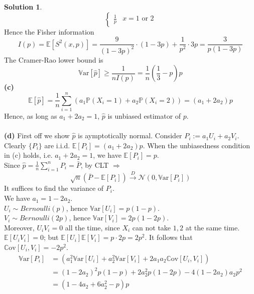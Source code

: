 \documentclass[a4paper, 10pt]{article}
\theoremstyle{definition}
\theoremstyle{hSol}
\newtheorem*{solution}{Solution}
\begin{document}
\begin{solution}
\begin{equation}
\begin{cases}
  \frac{1}{p} & x=1 \text{ or }2
  \end{cases}
\end{equation}
Hence the Fisher information
$$
I(p) = \mathbb{E}\left[S^2(x, p)\right] = \frac{9}{(1-3p)^2} \cdot (1-3p) + \frac{1}{p^2}\cdot 3p = \frac{3}{p(1-3p)}
$$
The Cramer-Rao lower bound is
$$
\mathrm{\mathbb{V}ar}\left[\hat{p}\right] \geq \frac{1}{nI(p)} = \frac{1}{n}\left(\frac{1}{3}-p\right)p
$$
\textbf{(c)}
\begin{equation}
  \mathbb{E}\left[\hat{p}\right] = \frac{1}{n}\sum_{i=1}^n \left(a_1 \mathbb{P}\left(X_i=1\right) + a_2 \mathbb{P}\left(X_i=2\right)\right) = (a_1 + 2a_2)p
\end{equation}
Hence, as long as $a_1+2a_2 = 1$, $\hat{p}$ is unbiased estimator of $p$.\\
~\\
\textbf{(d)} First off we show $\hat{p}$ is aymptotically normal. Consider $P_i:=a_1U_i + a_2V_i$. Clearly $\{P_i\}$ are i.i.d. $\mathbb{E}\left[P_i\right]=(a_1+2a_2)p$. When the unbiasedness condition in (c) holds, i.e. $a_1 + 2a_2=1$, we have $\mathbb{E}\left[P_i\right] = p$. \\
Since $\hat{p}=\frac{1}{n} \sum_{i=1}^nP_i = \bar{P}$, by CLT $\Rightarrow$
$$
\sqrt{n}(\bar{P} - \mathbb{E}\left[P_i\right]) \xrightarrow{D} \mathcal{N}(0, \mathrm{\mathbb{V}ar}\left[P_i\right])
$$
It suffices to find the variance of $P_i$.\\
We have $a_1 = 1-2a_2$. \\
$U_i\sim Bernoulli(p)$, hence $\mathrm{\mathbb{V}ar}\left[U_i\right]=p(1-p)$.\\
$V_i\sim Bernoulli(2p)$, hence $\mathrm{\mathbb{V}ar}\left[V_i\right]=2p(1-2p)$.\\
Moreover, $U_iV_i=0$ all the time, since $X_i$ can not take $1,2$ at the same time. $\mathbb{E}\left[U_iV_i\right]=0$; but $\mathbb{E}\left[U_i\right]\mathbb{E}\left[V_i\right]=p\cdot 2p = 2p^2$. It follows that $\mathrm{\mathbb{C}ov}\left[U_i, V_i\right] = -2p^2$.
\begin{equation}
  \begin{split}
    \mathrm{\mathbb{V}ar}\left[P_i\right] &= \left(a_1^2 \mathrm{\mathbb{V}ar}\left[U_i\right] + a_2^2 \mathrm{\mathbb{V}ar}\left[V_i\right] + 2a_1a_2 \mathrm{\mathbb{C}ov}\left[U_i, V_i\right]\right)\\
    &=(1-2a_2)^2 p(1-p) + 2a_2^2p(1-2p) - 4(1-2a_2)a_2p^2\\
    &=\left(1-4a_2+6a_2^2-p\right)p
  \end{split}

\end{equation}
\end{solution}
\end{document}
